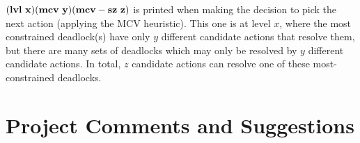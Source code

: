 $\bf{(lvl\ x) (mcv\ y) (mcv-sz\ z)}$ is printed when making the decision to pick the next action (applying the MCV heuristic). This one is at level $x$, where the most constrained deadlock(s) have only $y$ different candidate actions that resolve them, but there are many sets of deadlocks which may only be resolved by $y$ different candidate actions. In total, $z$ candidate actions can resolve one of these most-constrained deadlocks.

\section{Project Comments and Suggestions}










